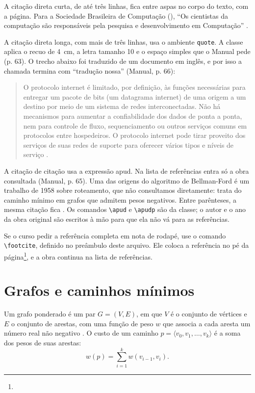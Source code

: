 \documentclass[eq,capa]{texufpel}
\newcommand{\footcite}[1]{\footnote{\bibentry{#1}}}
\begin{document}
A citação direta curta, de até três linhas, fica entre aspas no corpo do
texto, com a página. Para a Sociedade Brasileira de Computação
(), ``Os cientistas da
computação são responsáveis pela pesquisa e desenvolvimento em Computação''
\citep[p.~30]{Zorzo:2017:RFC}.

A citação direta longa, com mais de três linhas, usa o ambiente
\texttt{quote}. A classe aplica o recuo de 4~cm, a letra tamanho 10 e o espaço
simples que o Manual pede (p. 63). O trecho abaixo foi traduzido de um
documento em inglês, e por isso a chamada termina com ``tradução nossa''
(Manual, p. 66):

\begin{quote}
O protocolo internet é limitado, por definição, às funções necessárias para
entregar um pacote de bits (um datagrama internet) de uma origem a um destino
por meio de um sistema de redes interconectadas. Não há mecanismos para
aumentar a confiabilidade dos dados de ponta a ponta, nem para controle de
fluxo, sequenciamento ou outros serviços comuns em protocolos entre
hospedeiros. O protocolo internet pode tirar proveito dos serviços de suas
redes de suporte para oferecer vários tipos e níveis de serviço
\citep[p.~1, tradução nossa]{Postel:1981:IP}.
\end{quote}

A citação de citação usa a expressão apud. Na lista de referências entra só a
obra consultada (Manual, p. 65). Uma das origens do algoritmo de Bellman-Ford é um
trabalho de 1958 sobre roteamento, que não consultamos diretamente:
 trata do caminho mínimo em grafos que
admitem pesos negativos. Entre parênteses, a mesma citação fica
. Os comandos \verb|\apud| e
\verb|\apudp| são da classe; o autor e o ano da obra original são escritos à
mão para que ela não vá para as referências.

Se o curso pedir a referência completa em nota de rodapé, use o comando
\verb|\footcite|, definido no preâmbulo deste arquivo. Ele coloca a referência
no pé da página\footcite{Postel:1981:IP}, e a obra continua na lista de
referências.

\section{Grafos e caminhos mínimos}
\label{sec:grafos}

Um grafo ponderado é um par $G = (V, E)$, em que $V$ é o conjunto de vértices
e $E$ o conjunto de arestas, com uma função de peso $w$ que associa a cada
aresta um número real não negativo \citep{Cormen:2022:IA}. O custo de um
caminho $p = \langle v_0, v_1, \dots, v_k \rangle$ é a soma dos pesos de suas
arestas:
\begin{equation}
  w(p) = \sum_{i=1}^{k} w(v_{i-1}, v_i).
  \label{eq:custo}
\end{equation}
\end{document}
